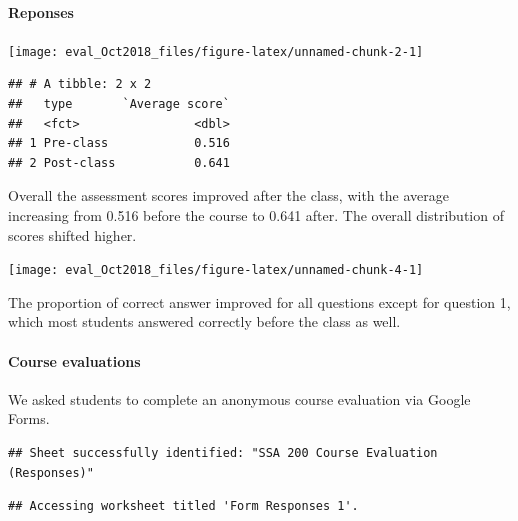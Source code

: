\documentclass[]{article}
\let\oldparagraph\paragraph
\renewcommand{\paragraph}[1]{\oldparagraph{#1}\mbox{}}
\begin{document}
\hypertarget{reponses}{%
\paragraph{Reponses}\label{reponses}}

\begin{center}\texttt{[image: eval\_Oct2018\_files/figure-latex/unnamed-chunk-2-1]} \end{center}

\begin{verbatim}
## # A tibble: 2 x 2
##   type       `Average score`
##   <fct>                <dbl>
## 1 Pre-class            0.516
## 2 Post-class           0.641
\end{verbatim}

Overall the assessment scores improved after the class, with the average
increasing from 0.516 before the course to 0.641 after. The overall
distribution of scores shifted higher.

\begin{center}\texttt{[image: eval\_Oct2018\_files/figure-latex/unnamed-chunk-4-1]} \end{center}

The proportion of correct answer improved for all questions except for
question 1, which most students answered correctly before the class as
well.

\hypertarget{course-evaluations}{%
\paragraph{Course evaluations}\label{course-evaluations}}

We asked students to complete an anonymous course evaluation via Google
Forms.

\begin{verbatim}
## Sheet successfully identified: "SSA 200 Course Evaluation (Responses)"
\end{verbatim}

\begin{verbatim}
## Accessing worksheet titled 'Form Responses 1'.
\end{verbatim}
\end{document}

